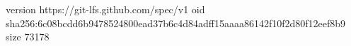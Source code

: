 version https://git-lfs.github.com/spec/v1
oid sha256:6c08bcdd6b9478524800ead37b6c4d84adff15aaaa86142f10f2d80f12eef8b9
size 73178
